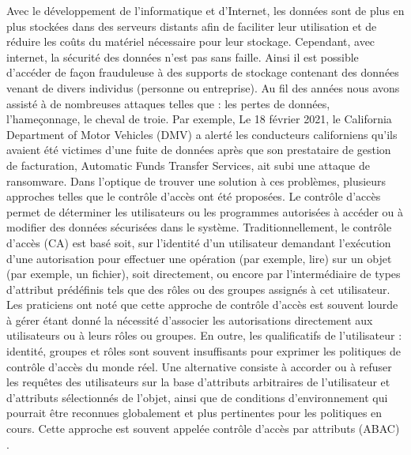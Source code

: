 

  Avec le développement de l'informatique et d'Internet, les données sont de plus en plus stockées dans des serveurs distants afin de faciliter leur utilisation et de réduire les coûts du matériel nécessaire pour leur stockage. Cependant, avec internet, la sécurité des données n'est pas sans faille. Ainsi il est possible d'accéder de façon frauduleuse à des supports de stockage contenant des données venant de divers individus (personne ou entreprise). Au fil des années nous avons assisté à de nombreuses attaques telles que : les pertes de données, l'hameçonnage, le cheval de troie. Par exemple, Le 18 février 2021, le California Department of Motor Vehicles (DMV) a alerté les conducteurs californiens qu'ils avaient été victimes d'une fuite de données après que son prestataire de gestion de facturation, Automatic Funds Transfer Services, ait subi une attaque de ransomware. Dans l'optique de trouver une solution à ces problèmes, plusieurs approches telles que le contrôle d'accès ont été proposées. Le contrôle d'accès  permet de déterminer les utilisateurs ou les programmes autorisées à accéder ou à modifier des données sécurisées dans le système. Traditionnellement, le contrôle d'accès (CA) est basé soit, sur l'identité d'un utilisateur demandant l'exécution d'une autorisation pour effectuer une opération (par exemple, lire) sur un objet (par exemple, un fichier), soit directement, ou encore par l'intermédiaire de types d'attribut prédéfinis tels que des rôles ou des groupes assignés à cet utilisateur. Les praticiens ont noté que cette approche de contrôle d'accès est souvent lourde à gérer étant donné la nécessité d'associer les autorisations directement aux utilisateurs ou à leurs rôles ou groupes. En outre, les qualificatifs de l'utilisateur : identité, groupes et rôles sont souvent insuffisants pour exprimer les politiques de contrôle d'accès du monde réel. Une alternative consiste à accorder ou à refuser les requêtes des utilisateurs sur la base d'attributs arbitraires de l'utilisateur et d'attributs sélectionnés de l'objet, ainsi que de conditions d'environnement qui pourrait être reconnues globalement et plus pertinentes pour les politiques en cours. Cette approche est souvent appelée contrôle d'accès par attributs (ABAC) \cite{Vin15}. \\
